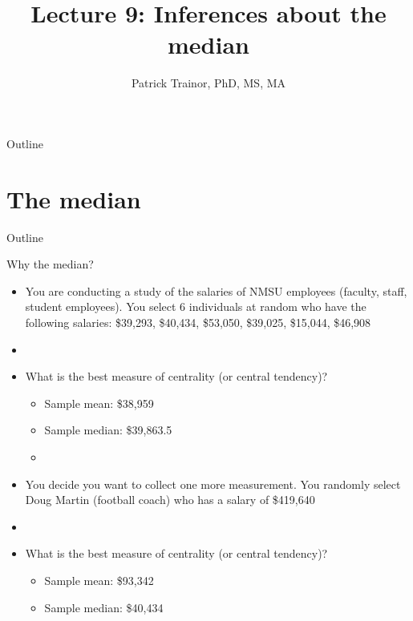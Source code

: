 \documentclass[xcolor=dvipsnames]{beamer}
\title[Lecture 9]{Lecture 9: Inferences about the median}
\author[Patrick Trainor]{Patrick Trainor, PhD, MS, MA}
\institute[NMSU]{New Mexico State University}
\date{}
\begin{document}
\begin{frame}
	\maketitle
\end{frame}

\begin{frame}{Outline}
	\tableofcontents[hideallsubsections]
\end{frame}

\section{The median}
\begin{frame}{Outline}
\tableofcontents[currentsection,subsectionstyle=show/shaded/hide]
\end{frame}

\begin{frame}{Why the median?}
	\begin{itemize}
		\item You are conducting a study of the salaries of NMSU employees (faculty, staff, student employees). You select 6 individuals at random who have the following salaries: \$39,293, \$40,434, \$53,050, \$39,025, \$15,044, \$46,908 \pause
		\item[]
		\item What is the best measure of centrality (or central tendency)? \pause
		\begin{itemize}
			\item Sample mean: \$38,959 \pause
			\item Sample median: \$39,863.5 \pause
			\item[]
		\end{itemize}
	\item You decide you want to collect one more measurement. You randomly select Doug Martin (football coach) who has a salary of \$419,640 \pause
	\item[]
			\item What is the best measure of centrality (or central tendency)? \pause
	\begin{itemize}
		\item Sample mean: \$93,342 \pause
		\item Sample median: \$40,434
	\end{itemize}
	\end{itemize}
\end{frame}
\end{document}
